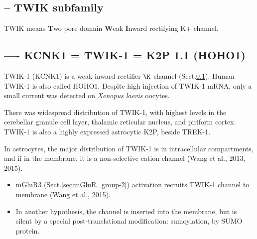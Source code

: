 \subsection{-- TWIK subfamily}
\label{sec:TWIK-channel}

TWIK means {\bf T}wo pore domain {\bf W}eak {\bf I}nward rectifying K+ channel.

\subsection{---- KCNK1 = TWIK-1 = K2P 1.1 (HOHO1)}
\label{sec:TWIK-1-channel}
\label{sec:KCNK1}
\label{sec:HOHO1}

TWIK-1 (KCNK1) is a weak inward rectifier $\K$ channel
(Sect.\ref{sec:TWIK-channel}).
Human TWIK-1 is also called HOHO1.
Despite high injection of TWIK-1 mRNA, only a small current was detected on {\it
Xenopus laevis} oocytes.

There was widespread distribution of  TWIK-1,  with  highest  levels  in  the
cerebellar  granule  cell layer, thalamic reticular nucleus, and piriform
cortex. TWIK-1 is also a highly expressed astrocytic K2P, beside TREK-1.

In astrocytes, the major distribution of TWIK-1 is in intracellular
compartments, and if in the membrane, it is a non-selective cation channel (Wang
et al., 2013, 2015).

\begin{itemize}
  \item mGluR3 (Sect.\ref{sec:mGluR_group-2}) activation recruits TWIK-1 channel
  to membrane (Wang et al., 2015).
  


  \item  In another hypothesis, the channel is inserted into the membrane, but
  is silent by a special post-translational modification: sumoylation, by SUMO
  protein.
\end{itemize}

